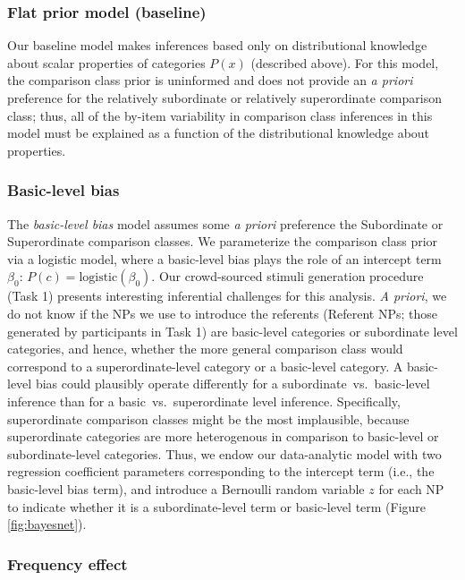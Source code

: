 \documentclass[doc]{apa6}
\begin{document}

\subsubsection{Flat prior model (baseline)}

Our baseline model makes inferences based only on distributional knowledge about scalar properties of categories $P(x)$ (described above).
For this model, the comparison class prior is uninformed and does not provide an \emph{a priori} preference for the relatively subordinate or relatively superordinate comparison class; thus, all of the by-item variability in comparison class inferences in this model must be explained as a function of the distributional knowledge about properties.

\subsubsection{Basic-level bias}

The \emph{basic-level bias} model assumes some \emph{a priori} preference the Subordinate or Superordinate comparison classes.
We parameterize the comparison class prior via a logistic model, where a basic-level bias plays the role of an intercept term $\beta_0$: $P(c) = \text{logistic}(\beta_0)$.
Our crowd-sourced stimuli generation procedure (Task 1) presents interesting inferential challenges for this analysis. 
\emph{A priori}, we do not know if the NPs we use to introduce the referents (Referent NPs; those generated by participants in Task 1) are basic-level categories or subordinate level categories, and hence, whether the more general comparison class would correspond to a superordinate-level category or a basic-level category.
A basic-level bias could plausibly operate differently for a subordinate~vs.~basic-level inference than for a basic~vs.~superordinate level inference. 
Specifically, superordinate comparison classes might be the most implausible, because superordinate categories are more heterogenous in comparison to basic-level or subordinate-level categories.
Thus, we endow our data-analytic model with two regression coefficient parameters corresponding to the intercept term (i.e., the basic-level bias term), and introduce a Bernoulli random variable $z$ for each NP to indicate whether it is a subordinate-level term or basic-level term (Figure \ref{fig:bayesnet}).

\subsubsection{Frequency effect}
\end{document}
